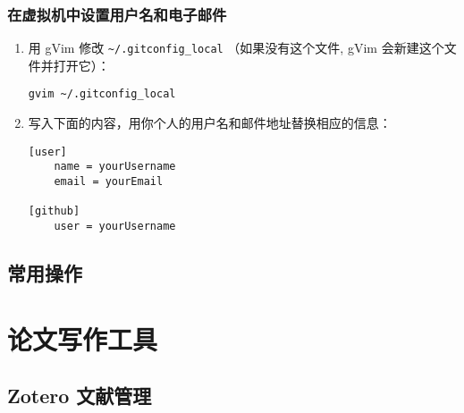 \documentclass[
    11pt,
    base=hide,
    cite=authoryear,
    device=phone,
    lang=cn,
    mode=simple,
    result=answer,
    toc=onecol,
]{elegantbook_sierxue}
\begin{document}
\subsection{在虚拟机中设置用户名和电子邮件}%
\label{sub:git-user-info}

\begin{enumerate}
    \item 用 gVim 修改 \lstinline{~/.gitconfig_local}
        （如果没有这个文件, gVim 会新建这个文件并打开它）：
\begin{lstlisting}[style=lst]
gvim ~/.gitconfig_local
\end{lstlisting}
    \item 写入下面的内容，用你个人的用户名和邮件地址替换相应的信息：
\begin{lstlisting}[style=lst]
[user]
	name = yourUsername
	email = yourEmail

[github]
	user = yourUsername
\end{lstlisting}
\end{enumerate}

%
%
%
%
\newpage
\section{常用操作}%
\label{sec:git-tips}
%

\chapter{论文写作工具}%
\label{cha:tools-writing}

\section{Zotero 文献管理}%
\label{sec:citation-zotero}

\newpage



%

\appendix



\printindex
\printglossary[title={术语表}]
\end{document}

